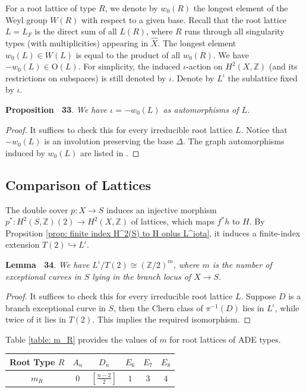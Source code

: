 \documentclass[
]{article}
\begin{document}
For a root lattice of type \(R\), we denote by \(w_0(R)\) the longest
element of the Weyl group \(W(R)\) with respect to a given base. Recall
that the root lattice \(L=L_F\) is the direct sum of all \(L(R)\), where
\(R\) runs through all singularity types (with multiplicities) appearing
in \(\widehat{X}\). The longest element \(w_0(L)\in W(L)\) is equal to
the product of all \(w_0(R)\). We have \(-w_0(L)\in \mathrm{O}(L)\). For
simplicity, the induced \(\iota\)-action on \(H^2(X,\mathbb{Z})\) (and
its restrictions on subspaces) is still denoted by \(\iota\). Denote by
\(L^\iota\) the sublattice fixed by \(\iota\).

\textbf{Proposition~ 33}. \emph{We have \(\iota=-w_0(L)\) as
automorphisms of \(L\).}

\emph{Proof.} It suffices to check this for every irreducible root
lattice \(L\). Notice that \(-w_0(L)\) is an involution preserving the
base \(\Delta\). The graph automorphisms induced by \(w_0(L)\) are
listed in \cite[PLATE I--X]{bourbaki2002lie4-6}.~◻

\subsection{Comparison of Lattices}\label{comparison-of-lattices}

The double cover \(p\colon X\to S\) induces an injective morphism
\(p^*\colon H^2(S,\mathbb{Z})(2)\to H^2(X,\mathbb{Z})\) of lattices,
which maps \(f^* h\) to \(H\). By Propsition
\ref{prop: finite index H^2(S) to H oplus L^iota}, it induces a
finite-index extension \(T(2)\hookrightarrow L^{\iota}\).

\textbf{Lemma~ 34}. \emph{\label{lem: T_F and L_F} We have
\(L^{\iota}/T(2)\cong (\mathbb{Z}/2)^m\), where \(m\) is the number of
exceptional curves in \(S\) lying in the branch locus of \(X\to S\).}

\emph{Proof.} It suffices to check this for every irreducible root
lattice \(L\). Suppose \(D\) is a branch exceptional curve in \(S\),
then the Chern class of \(\pi^{-1}(D)\) lies in \(L^\iota\), while twice
of it lies in \(T(2)\). This implies the required isomorphism.~◻

Table \ref{table: m_R} provides the values of \(m\) for root lattices of
ADE types.

\centering    

\begin{longtable}[]{@{}cccccc@{}}
\toprule\noalign{}
Root Type \(R\) & \(A_n\) & \(D_n\) & \(E_6\) & \(E_7\) & \(E_8\) \\
\midrule\noalign{}
\endhead
\bottomrule\noalign{}
\endlastfoot
\(m_R\) & \(0\) & \([\frac{n-2}{2}]\) & \(1\) & \(3\) & \(4\) \\
\end{longtable}
\end{document}
